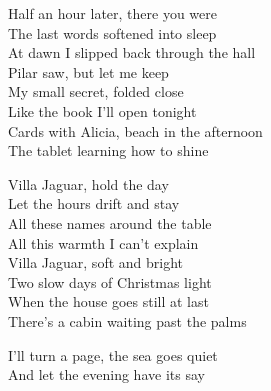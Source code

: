 \begin{lyrics}
Half an hour later, there you were\\
The last words softened into sleep\\
At dawn I slipped back through the hall\\
Pilar saw, but let me keep\\
My small secret, folded close\\
Like the book I’ll open tonight\\
Cards with Alicia, beach in the afternoon\\
The tablet learning how to shine

Villa Jaguar, hold the day\\
Let the hours drift and stay\\
All these names around the table\\
All this warmth I can’t explain\\
Villa Jaguar, soft and bright\\
Two slow days of Christmas light\\
When the house goes still at last\\
There’s a cabin waiting past the palms

I’ll turn a page, the sea goes quiet\\
And let the evening have its say
\end{lyrics}

